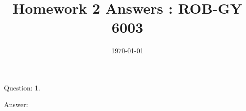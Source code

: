 \documentclass[a4paper]{article}
\title{Homework 2 Answers : ROB-GY 6003}
\author{\myName}
\date{\today}
\newcommand{\myName}{\textbf{Shantanu Ghodgaonkar}\\\textit{Univ ID}: N11344563\\\textit{Net ID}: sng8399\\\textit{Ph.No.}: +1 (929) 922-0614}
\begin{document}
	
	
	\begin{qalist}			
		\item[Question: 1.] \setcounter{equation}{0} %
		\item[Answer:] 
%
%
%
%
%
%
		
	\end{qalist}
\end{document}
